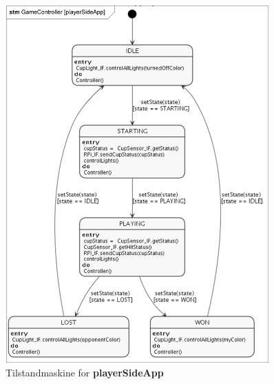 \documentclass[Rapport/Rapport_main.tex]{subfiles}
\begin{document}
\begin{figure}[H]
    \centering
    \includegraphics[width=0.9\textwidth]{Arkitektur/Softwarearkitektur/Applikationsmodel/PlayerSide/graphics/state.png}
    \caption{Tilstandmaskine for \textbf{playerSideApp}}
    \label{fig:playerSide_SM}
\end{figure}
\end{document}

